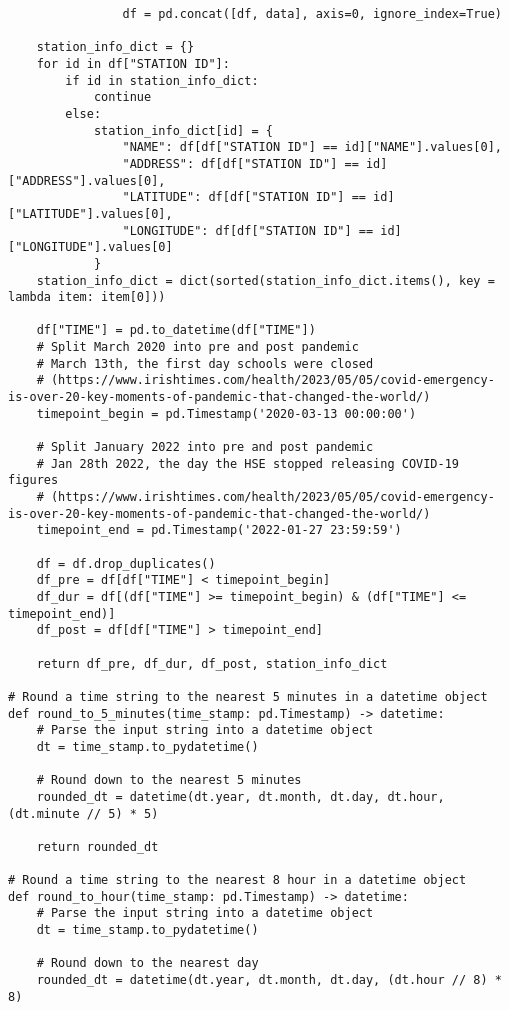 \begin{lstlisting}
                df = pd.concat([df, data], axis=0, ignore_index=True)
    
    station_info_dict = {}
    for id in df["STATION ID"]:
        if id in station_info_dict:
            continue
        else:
            station_info_dict[id] = {
                "NAME": df[df["STATION ID"] == id]["NAME"].values[0],
                "ADDRESS": df[df["STATION ID"] == id]["ADDRESS"].values[0],
                "LATITUDE": df[df["STATION ID"] == id]["LATITUDE"].values[0],
                "LONGITUDE": df[df["STATION ID"] == id]["LONGITUDE"].values[0]
            }
    station_info_dict = dict(sorted(station_info_dict.items(), key = lambda item: item[0]))
    
    df["TIME"] = pd.to_datetime(df["TIME"])
    # Split March 2020 into pre and post pandemic
    # March 13th, the first day schools were closed 
    # (https://www.irishtimes.com/health/2023/05/05/covid-emergency-is-over-20-key-moments-of-pandemic-that-changed-the-world/)
    timepoint_begin = pd.Timestamp('2020-03-13 00:00:00')
    
    # Split January 2022 into pre and post pandemic
    # Jan 28th 2022, the day the HSE stopped releasing COVID-19 figures 
    # (https://www.irishtimes.com/health/2023/05/05/covid-emergency-is-over-20-key-moments-of-pandemic-that-changed-the-world/)
    timepoint_end = pd.Timestamp('2022-01-27 23:59:59')

    df = df.drop_duplicates()
    df_pre = df[df["TIME"] < timepoint_begin]
    df_dur = df[(df["TIME"] >= timepoint_begin) & (df["TIME"] <= timepoint_end)]
    df_post = df[df["TIME"] > timepoint_end]
    
    return df_pre, df_dur, df_post, station_info_dict

# Round a time string to the nearest 5 minutes in a datetime object
def round_to_5_minutes(time_stamp: pd.Timestamp) -> datetime:
    # Parse the input string into a datetime object
    dt = time_stamp.to_pydatetime()

    # Round down to the nearest 5 minutes
    rounded_dt = datetime(dt.year, dt.month, dt.day, dt.hour, (dt.minute // 5) * 5)

    return rounded_dt

# Round a time string to the nearest 8 hour in a datetime object
def round_to_hour(time_stamp: pd.Timestamp) -> datetime:
    # Parse the input string into a datetime object
    dt = time_stamp.to_pydatetime()

    # Round down to the nearest day
    rounded_dt = datetime(dt.year, dt.month, dt.day, (dt.hour // 8) * 8)


\end{lstlisting}

